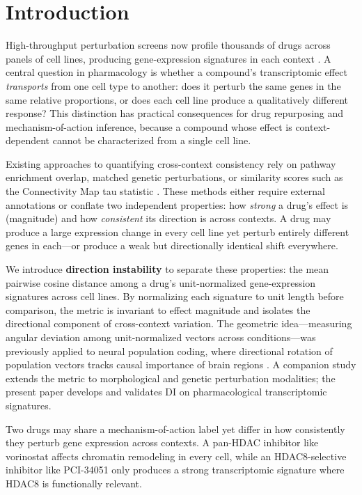 \documentclass[11pt]{article}
\begin{document}
\section{Introduction}

High-throughput perturbation screens now profile thousands of drugs
across panels of cell lines, producing gene-expression signatures in
each context \citep{subramanian2017next,lamb2006connectivity}.  A central
question in pharmacology is whether a compound's transcriptomic effect
\emph{transports} from one cell type to another: does it perturb the
same genes in the same relative proportions, or does each cell line
produce a qualitatively different response?  This distinction has
practical consequences for drug repurposing and mechanism-of-action
inference, because a compound whose effect is context-dependent cannot
be characterized from a single cell line.

Existing approaches to quantifying cross-context consistency rely on
pathway enrichment overlap, matched genetic perturbations, or
similarity scores such as the Connectivity Map tau statistic
\citep{subramanian2017next}.  These methods either require external
annotations or conflate two independent properties: how \emph{strong}
a drug's effect is (magnitude) and how \emph{consistent} its
direction is across contexts.  A drug may produce a large expression
change in every cell line yet perturb entirely different genes in
each---or produce a weak but directionally identical shift everywhere.

We introduce \textbf{direction instability} to separate these
properties: the mean pairwise cosine distance among a drug's
unit-normalized gene-expression signatures across cell lines.  By
normalizing each signature to unit length before comparison, the metric
is invariant to effect magnitude and isolates the directional component
of cross-context variation.  The geometric idea---measuring angular
deviation among unit-normalized vectors across conditions---was
previously applied to neural population coding, where directional
rotation of population vectors tracks causal importance of brain regions
\citep{tower2026bracket}.  A companion study \citep{tower2026atlas}
extends the metric to morphological and genetic perturbation
modalities; the present paper develops and validates DI on
pharmacological transcriptomic signatures.

Two drugs may share a mechanism-of-action label yet differ in how
consistently they perturb gene expression across contexts.  A pan-HDAC
inhibitor like vorinostat affects chromatin remodeling in every cell,
while an HDAC8-selective inhibitor like PCI-34051 only produces a strong
transcriptomic signature where HDAC8 is functionally relevant.
\end{document}
